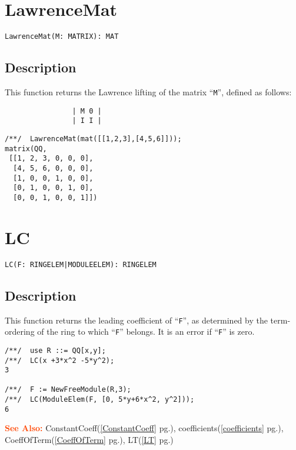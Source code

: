 \documentclass[a4paper]{mybook}
\newenvironment{command}{}{} %
\newcommand\SeeAlso{\par\textcolor{OrangeRed}{\textbf{\large See Also: }}}
\begin{document}
\section{LawrenceMat}
\label{LawrenceMat}
\begin{command} %


\begin{Verbatim}[label=syntax, rulecolor=\color{MidnightBlue},
frame=single]
LawrenceMat(M: MATRIX): MAT
\end{Verbatim}


\subsection*{Description}

This function returns the Lawrence lifting of the matrix ``\verb&M&'',
defined as follows:
\begin{verbatim}
                | M 0 |
                | I I |
\end{verbatim}
\begin{Verbatim}[label=example, rulecolor=\color{PineGreen}, frame=single]
/**/  LawrenceMat(mat([[1,2,3],[4,5,6]]));
matrix(QQ,
 [[1, 2, 3, 0, 0, 0],
  [4, 5, 6, 0, 0, 0],
  [1, 0, 0, 1, 0, 0],
  [0, 1, 0, 0, 1, 0],
  [0, 0, 1, 0, 0, 1]])
\end{Verbatim}


\end{command} %

\section{LC}
\label{LC}
\begin{command} %


\begin{Verbatim}[label=syntax, rulecolor=\color{MidnightBlue},
frame=single]
LC(F: RINGELEM|MODULEELEM): RINGELEM
\end{Verbatim}


\subsection*{Description}

This function returns the leading coefficient of ``\verb&F&'', as determined by
the term-ordering of the ring to which ``\verb&F&'' belongs.  It is an error if ``\verb&F&''
is zero.
\begin{Verbatim}[label=example, rulecolor=\color{PineGreen}, frame=single]
/**/  use R ::= QQ[x,y];
/**/  LC(x +3*x^2 -5*y^2);
3

/**/  F := NewFreeModule(R,3);
/**/  LC(ModuleElem(F, [0, 5*y+6*x^2, y^2]));
6
\end{Verbatim}


\SeeAlso %
  ConstantCoeff(\ref{ConstantCoeff} pg.\pageref{ConstantCoeff}), 
    coefficients(\ref{coefficients} pg.\pageref{coefficients}), 
    CoeffOfTerm(\ref{CoeffOfTerm} pg.\pageref{CoeffOfTerm}), 
    LT(\ref{LT} pg.\pageref{LT})
\end{command} %
\end{document}
